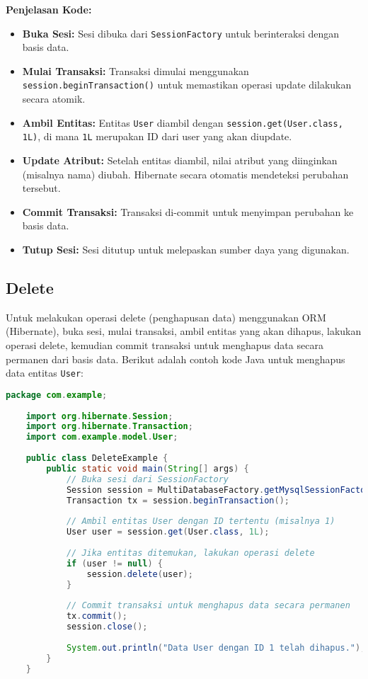 \textbf{Penjelasan Kode:}
\begin{itemize}
	\item \textbf{Buka Sesi:} Sesi dibuka dari \texttt{SessionFactory} untuk berinteraksi dengan basis data.
	\item \textbf{Mulai Transaksi:} Transaksi dimulai menggunakan \texttt{session.beginTransaction()} untuk memastikan operasi update dilakukan secara atomik.
	\item \textbf{Ambil Entitas:} Entitas \texttt{User} diambil dengan \texttt{session.get(User.class, 1L)}, di mana \texttt{1L} merupakan ID dari user yang akan diupdate.
	\item \textbf{Update Atribut:} Setelah entitas diambil, nilai atribut yang diinginkan (misalnya nama) diubah. Hibernate secara otomatis mendeteksi perubahan tersebut.
	\item \textbf{Commit Transaksi:} Transaksi di-commit untuk menyimpan perubahan ke basis data.
	\item \textbf{Tutup Sesi:} Sesi ditutup untuk melepaskan sumber daya yang digunakan.
\end{itemize}

\subsection{Delete}

Untuk melakukan operasi delete (penghapusan data) menggunakan ORM (Hibernate), buka sesi, mulai transaksi, ambil entitas yang akan dihapus, lakukan operasi delete, kemudian commit transaksi untuk menghapus data secara permanen dari basis data. Berikut adalah contoh kode Java untuk menghapus data entitas \texttt{User}:

\begin{lstlisting}[language=Java, style=JavaStyle]
	package com.example;
	
	import org.hibernate.Session;
	import org.hibernate.Transaction;
	import com.example.model.User;
	
	public class DeleteExample {
		public static void main(String[] args) {
			// Buka sesi dari SessionFactory
			Session session = MultiDatabaseFactory.getMysqlSessionFactory().openSession();
			Transaction tx = session.beginTransaction();
			
			// Ambil entitas User dengan ID tertentu (misalnya 1)
			User user = session.get(User.class, 1L);
			
			// Jika entitas ditemukan, lakukan operasi delete
			if (user != null) {
				session.delete(user);
			}
			
			// Commit transaksi untuk menghapus data secara permanen
			tx.commit();
			session.close();
			
			System.out.println("Data User dengan ID 1 telah dihapus.");
		}
	}
\end{lstlisting}

